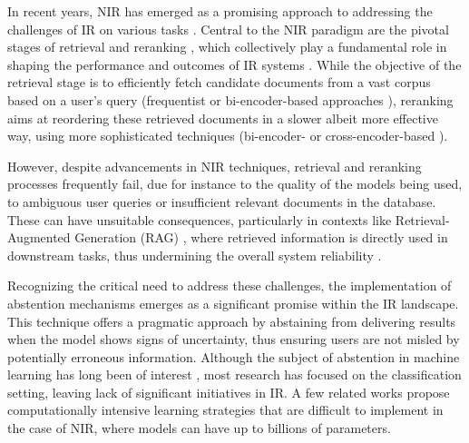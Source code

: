 In recent years, NIR has emerged as a promising approach to addressing the challenges of IR on various tasks . Central to the NIR paradigm are the pivotal stages of retrieval and reranking , which collectively play a fundamental role in shaping the performance and outcomes of IR systems . While the objective of the retrieval stage is to efficiently fetch candidate documents from a vast corpus based on a user's query (frequentist  or bi-encoder-based approaches ), reranking aims at reordering these retrieved documents in a slower albeit more effective way, using more sophisticated techniques (bi-encoder- or cross-encoder-based ).

However, despite advancements in NIR techniques, retrieval and reranking processes frequently fail, due for instance to the quality of the models being used, to ambiguous user queries or insufficient relevant documents in the database. These can have unsuitable consequences, particularly in contexts like Retrieval-Augmented Generation (RAG) , where retrieved information is directly used in downstream tasks, thus undermining the overall system reliability .

Recognizing the critical need to address these challenges, the implementation of abstention mechanisms emerges as a significant promise within the IR landscape. This technique offers a pragmatic approach by abstaining from delivering results when the model shows signs of uncertainty, thus ensuring users are not misled by potentially erroneous information. Although the subject of abstention in machine learning has long been of interest , most research has focused on the classification setting, leaving lack of significant initiatives in IR. A few related works propose computationally intensive learning strategies  that are difficult to implement in the case of NIR, where models can have up to billions of parameters.

